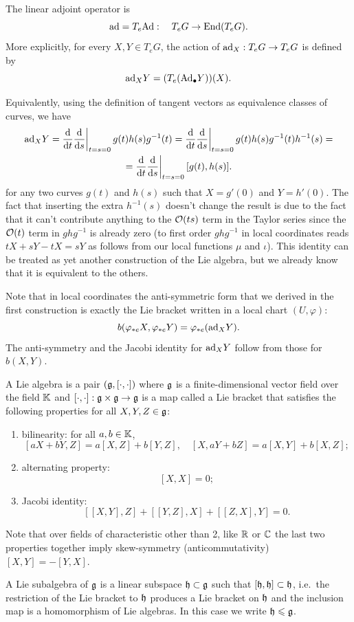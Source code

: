 \begin{defn}
    The linear adjoint operator is
    \[\mathrm{ad}=T_e \mathrm{Ad}: \quad T_eG\to \operatorname{End}(T_eG).\]
    More explicitly, for every $X,Y\in T_eG$, the action of $\mathrm{ad}_X:T_eG\to T_eG$ is defined by
    \[\mathrm{ad}_X Y=(T_e(\mathrm{Ad}_\bullet Y))(X).\]
\end{defn}

Equivalently, using the definition of tangent vectors as equivalence classes of curves, we have
\begin{multline}
    \ad_X Y=\restr{\frac{\dd}{\dd t} \frac{\dd}{\dd s}}{t=s=0}g(t)h(s)g^{-1}(t)=\restr{\frac{\dd}{\dd t} \frac{\dd}{\dd s}}{t=s=0}g(t)h(s)g^{-1}(t)h^{-1}(s)=\\=\restr{\frac{\dd}{\dd t} \frac{\dd}{\dd s}}{t=s=0}{} [g(t),h(s)].\label{30071}
\end{multline}
for any two curves $g(t)$ and $h(s)$ such that $X=g'(0)$ and $Y=h'(0)$. The fact that inserting the extra $h^{-1}(s)$ doesn't change the result is due to the fact that it can't contribute anything to the $\mathcal{O}(ts)$ term in the Taylor series since the $\mathcal{O}(t)$ term in $ghg^{-1}$ is already zero (to first order $ghg^{-1}$ in local coordinates reads $tX+sY-tX=sY$ as follows from our local functions $\mu$ and $\iota$). This identity can be treated as yet another construction of the Lie algebra, but we already know that it is equivalent to the others.

Note that in local coordinates the anti-symmetric form that we derived in the first construction is exactly the Lie bracket written in a local chart $(U,\varphi)$:
\[b(\varphi_{\ast e} X,\varphi_{\ast e} Y)=\varphi_{\ast e}(\mathrm{ad}_X Y).\]
The anti-symmetry and the Jacobi identity for $\mathrm{ad}_X Y$ follow from those for $b(X,Y)$.

\begin{defn}
    A Lie algebra is a pair $(\mathfrak{g},[\cdot,\cdot])$ where $\mathfrak{g}$ is a finite-dimensional vector field over the field $\mathbb{K}$ and $[\cdot,\cdot]:\mathfrak{g}\times\mathfrak{g}\to\mathfrak{g}$ is a map called a Lie bracket that satisfies the following properties for all $X,Y,Z\in \mathfrak{g}$:
    \begin{enumerate}
        \item bilinearity: for all $a,b\in \mathbb{K}$,
        \[[aX+bY,Z]=a[X,Z]+b[Y,Z],\quad [X,aY+bZ]=a[X,Y]+b[X,Z];\]
        \item alternating property:
        \[[X,X]=0;\]
        \item Jacobi identity:
        \[[[X,Y],Z]+[[Y,Z],X]+[[Z,X],Y]=0.\]
    \end{enumerate}
    Note that over fields of characteristic other than 2, like $\mathbb{R}$ or $\mathbb{C}$ the last two properties together imply skew-symmetry (anticommutativity) $[X,Y]=-[Y,X]$.

    A Lie subalgebra of $\mathfrak{g}$ is a linear subspace $\mathfrak{h}\subset\mathfrak{g}$ such that $[\mathfrak{h},\mathfrak{h}]\subset\mathfrak{h}$, i.e.~the restriction of the Lie bracket to $\mathfrak{h}$ produces a Lie bracket on $\mathfrak{h}$ and the inclusion map is a homomorphism of Lie algebras. In this case we write $\mathfrak{h}\leqslant \mathfrak{g}$.
\end{defn}



